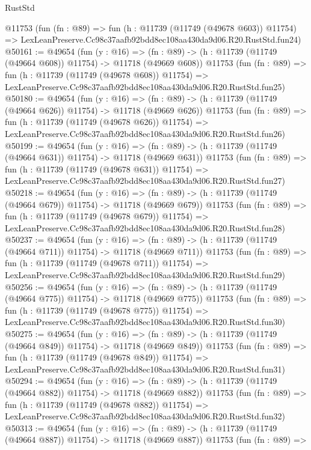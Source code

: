 \begin{lexlean}{RustStd}
\begin{coremodule}
    @11753
    (fun (fn : @89) =>
    fun (h : @11739 (@11749 (@49678 @603)) @11754) =>
    LexLeanPreserve.Cc98c37aafb92bdd8ec108aa430da9d06.R20.RustStd.fun24)
@50161 := @49654
    (fun (y : @16) =>
    (fn : @89) -> (h : @11739 (@11749 (@49664 @608)) @11754) -> @11718 (@49669 @608))
    @11753
    (fun (fn : @89) =>
    fun (h : @11739 (@11749 (@49678 @608)) @11754) =>
    LexLeanPreserve.Cc98c37aafb92bdd8ec108aa430da9d06.R20.RustStd.fun25)
@50180 := @49654
    (fun (y : @16) =>
    (fn : @89) -> (h : @11739 (@11749 (@49664 @626)) @11754) -> @11718 (@49669 @626))
    @11753
    (fun (fn : @89) =>
    fun (h : @11739 (@11749 (@49678 @626)) @11754) =>
    LexLeanPreserve.Cc98c37aafb92bdd8ec108aa430da9d06.R20.RustStd.fun26)
@50199 := @49654
    (fun (y : @16) =>
    (fn : @89) -> (h : @11739 (@11749 (@49664 @631)) @11754) -> @11718 (@49669 @631))
    @11753
    (fun (fn : @89) =>
    fun (h : @11739 (@11749 (@49678 @631)) @11754) =>
    LexLeanPreserve.Cc98c37aafb92bdd8ec108aa430da9d06.R20.RustStd.fun27)
@50218 := @49654
    (fun (y : @16) =>
    (fn : @89) -> (h : @11739 (@11749 (@49664 @679)) @11754) -> @11718 (@49669 @679))
    @11753
    (fun (fn : @89) =>
    fun (h : @11739 (@11749 (@49678 @679)) @11754) =>
    LexLeanPreserve.Cc98c37aafb92bdd8ec108aa430da9d06.R20.RustStd.fun28)
@50237 := @49654
    (fun (y : @16) =>
    (fn : @89) -> (h : @11739 (@11749 (@49664 @711)) @11754) -> @11718 (@49669 @711))
    @11753
    (fun (fn : @89) =>
    fun (h : @11739 (@11749 (@49678 @711)) @11754) =>
    LexLeanPreserve.Cc98c37aafb92bdd8ec108aa430da9d06.R20.RustStd.fun29)
@50256 := @49654
    (fun (y : @16) =>
    (fn : @89) -> (h : @11739 (@11749 (@49664 @775)) @11754) -> @11718 (@49669 @775))
    @11753
    (fun (fn : @89) =>
    fun (h : @11739 (@11749 (@49678 @775)) @11754) =>
    LexLeanPreserve.Cc98c37aafb92bdd8ec108aa430da9d06.R20.RustStd.fun30)
@50275 := @49654
    (fun (y : @16) =>
    (fn : @89) -> (h : @11739 (@11749 (@49664 @849)) @11754) -> @11718 (@49669 @849))
    @11753
    (fun (fn : @89) =>
    fun (h : @11739 (@11749 (@49678 @849)) @11754) =>
    LexLeanPreserve.Cc98c37aafb92bdd8ec108aa430da9d06.R20.RustStd.fun31)
@50294 := @49654
    (fun (y : @16) =>
    (fn : @89) -> (h : @11739 (@11749 (@49664 @882)) @11754) -> @11718 (@49669 @882))
    @11753
    (fun (fn : @89) =>
    fun (h : @11739 (@11749 (@49678 @882)) @11754) =>
    LexLeanPreserve.Cc98c37aafb92bdd8ec108aa430da9d06.R20.RustStd.fun32)
@50313 := @49654
    (fun (y : @16) =>
    (fn : @89) -> (h : @11739 (@11749 (@49664 @887)) @11754) -> @11718 (@49669 @887))
    @11753
    (fun (fn : @89) =>

\end{coremodule}
\end{lexlean}
